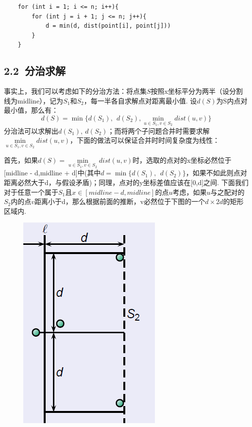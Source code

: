 \documentclass[UTF8]{ctexart}
\begin{document}
\begin{lstlisting}
    for (int i = 1; i <= n; i++){
		for (int j = i + 1; j <= n; j++){
			d = min(d, dist(point[i], point[j]))
		}
	}
\end{lstlisting}


\subsection*{2.2\ 分治求解}
事实上，我们可以考虑如下的分治方法：将点集$S$按照x坐标平分为两半（设分割线为midline），记为$S_1$和$S_2$，每一半各自求解点对距离最小值. 设$d({S})$为S内点对最小值，那么有：
\begin{equation}d(S)=\min\{d(S_1),\ \ d(S_2),\min_{u\in S_1,v\in S_2}dist(u,v)\}\end{equation}
分治法可以求解出$d(S_1),\ d(S_2)$；而将两个子问题合并时需要求解$\min\limits_{u\in S_1,v\in S_2}dist(u,v)$，下面的做法可以保证合并时时间复杂度为线性：\par
首先，如果$d(S)=\min\limits_{u\in S_1,v\in S_2}dist(u,v)$时，选取的点对的x坐标必然位于[midline - d,midline + d]中(其中$d=\min\{d(S_1),\ \ d(S_2)\}$，如果不如此则点对距离必然大于d，与假设矛盾)；同理，点对的y坐标差值应该在[0,d]之间. 下面我们对于任意一个属于$S_1$且$x\in [midline - d,midline]$的点$u$考虑，如果$u$与之配对的$S_2$内的点$v$距离小于d，那么根据前面的推断，v必然位于下图的一个$d\times 2d$的矩形区域内. 
\begin{figure}[H]\begin{center}
	\includegraphics[scale = 0.5]{graph1.PNG}
\end{center}\end{figure}\par
\end{document}
